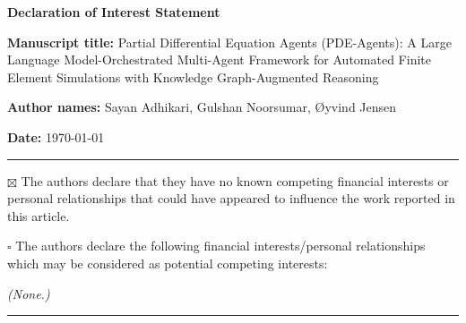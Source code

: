 \documentclass[12pt]{article}
\begin{document}
\begin{center}
{\Large\bfseries Declaration of Interest Statement}
\end{center}

\bigskip

\noindent\textbf{Manuscript title:} Partial Differential Equation Agents
(PDE-Agents): A Large Language Model-Orchestrated Multi-Agent Framework for
Automated Finite Element Simulations with Knowledge Graph-Augmented Reasoning

\bigskip

\noindent\textbf{Author names:} Sayan Adhikari, Gulshan Noorsumar, {\O}yvind Jensen

\bigskip

\noindent\textbf{Date:} \today

\bigskip\bigskip

\noindent\rule{\textwidth}{0.4pt}

\bigskip

$\boxtimes$ The authors declare that they have no known competing financial
interests or personal relationships that could have appeared to influence the
work reported in this article.

\bigskip

$\square$ The authors declare the following financial interests/personal
relationships which may be considered as potential competing interests:

\bigskip\bigskip

\noindent\textit{(None.)}

\bigskip\bigskip

\noindent\rule{\textwidth}{0.4pt}
\end{document}

